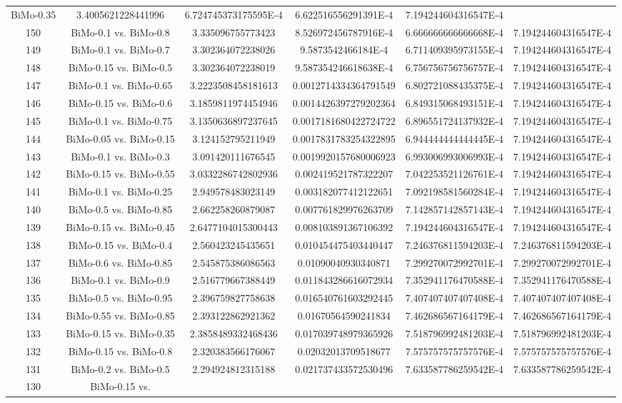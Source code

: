 \documentclass[a4paper,10pt]{article}
\begin{document}
\begin{landscape}
\begin{table}[!htp]
\begin{tabular}{cccccc}
BiMo-0.35&3.4005621228441996&6.724745373175595E-4&6.622516556291391E-4&7.194244604316547E-4\\150&BiMo-0.1 vs. BiMo-0.8&3.335096755773423&8.526972456787916E-4&6.666666666666668E-4&7.194244604316547E-4\\149&BiMo-0.1 vs. BiMo-0.7&3.302364072238026&9.5873542466184E-4&6.711409395973155E-4&7.194244604316547E-4\\148&BiMo-0.15 vs. BiMo-0.5&3.302364072238019&9.587354246618638E-4&6.756756756756757E-4&7.194244604316547E-4\\147&BiMo-0.1 vs. BiMo-0.65&3.2223508458181613&0.0012714334364791549&6.802721088435375E-4&7.194244604316547E-4\\146&BiMo-0.15 vs. BiMo-0.6&3.1859811974454946&0.0014426397279202364&6.849315068493151E-4&7.194244604316547E-4\\145&BiMo-0.1 vs. BiMo-0.75&3.1350636897237645&0.0017181680422724722&6.896551724137932E-4&7.194244604316547E-4\\144&BiMo-0.05 vs. BiMo-0.15&3.124152795211949&0.0017831783254322895&6.944444444444445E-4&7.194244604316547E-4\\143&BiMo-0.1 vs. BiMo-0.3&3.091420111676545&0.0019920157680006923&6.993006993006993E-4&7.194244604316547E-4\\142&BiMo-0.15 vs. BiMo-0.55&3.0332286742802936&0.002419521787322207&7.042253521126761E-4&7.194244604316547E-4\\141&BiMo-0.1 vs. BiMo-0.25&2.949578483023149&0.003182077412122651&7.092198581560284E-4&7.194244604316547E-4\\140&BiMo-0.5 vs. BiMo-0.85&2.662258260879087&0.007761829976263709&7.142857142857143E-4&7.194244604316547E-4\\139&BiMo-0.15 vs. BiMo-0.45&2.6477104015300443&0.008103891367106392&7.194244604316547E-4&7.194244604316547E-4\\138&BiMo-0.15 vs. BiMo-0.4&2.560423245435651&0.010454475403440447&7.246376811594203E-4&7.246376811594203E-4\\137&BiMo-0.6 vs. BiMo-0.85&2.545875386086563&0.01090040930340871&7.299270072992701E-4&7.299270072992701E-4\\136&BiMo-0.1 vs. BiMo-0.9&2.516779667388449&0.011843286616072934&7.352941176470588E-4&7.352941176470588E-4\\135&BiMo-0.5 vs. BiMo-0.95&2.396759827758638&0.016540761603292445&7.407407407407408E-4&7.407407407407408E-4\\134&BiMo-0.55 vs. BiMo-0.85&2.393122862921362&0.01670564590241834&7.462686567164179E-4&7.462686567164179E-4\\133&BiMo-0.15 vs. BiMo-0.35&2.3858489332468436&0.017039748979365926&7.518796992481203E-4&7.518796992481203E-4\\132&BiMo-0.15 vs. BiMo-0.8&2.320383566176067&0.02032013709518677&7.575757575757576E-4&7.575757575757576E-4\\131&BiMo-0.2 vs. BiMo-0.5&2.294924812315188&0.021737433572530496&7.633587786259542E-4&7.633587786259542E-4\\130&BiMo-0.15 vs. 
\end{tabular}
\end{table}
\end{landscape}
\end{document}
